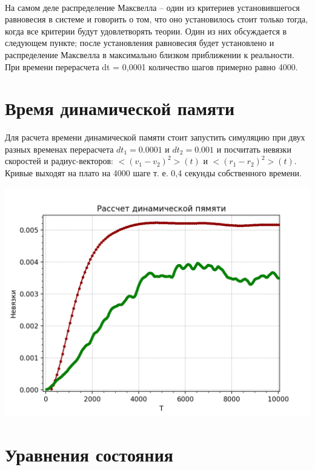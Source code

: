 \ 

\newline

На самом деле распределение Максвелла -- один из критериев установившегося равновесия в системе и говорить о том, что оно установилось стоит только тогда, когда все критерии будут удовлетворять теории. Один из них обсуждается в следующем пункте; после установления равновесия будет установлено и распределение Максвелла в максимально близком приближении к реальности. При времени перерасчета dt = 0,0001 количество шагов примерно равно 4000. 

\newpage

\section{Время динамической памяти}

Для расчета времени динамической памяти стоит запустить симуляцию при двух разных временах перерасчета  $dt_1 = 0.0001$ и $dt_2 = 0.001$ и посчитать невязки скоростей и радиус-векторов: $<(v_1 - v_2)^2>(t)$ и $<(r_1 - r_2)^2>(t)$. Кривые выходят на плато на 4000 шаге т. е. 0,4 секунды собственного времени. 

\begin{center}
        \includegraphics[width=\linewidth]{Residuals.png}\\
\end{center}

\section{Уравнения состояния}
